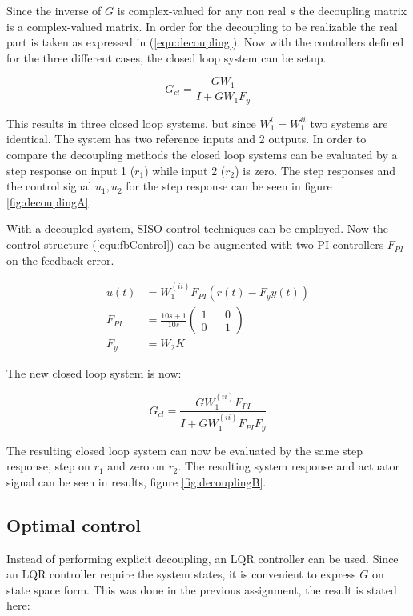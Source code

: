 \documentclass[a4paper, titlepage]{article}
\begin{document}
Since the inverse of $G$ is complex-valued for any non real $s$ the decoupling matrix is a complex-valued matrix.
In order for the decoupling to be realizable the real part is taken as expressed in (\ref{equ:decoupling}).
Now with the controllers defined for the three different cases, the closed loop system can be setup.

\begin{equation}
G_{cl} = \frac{GW_1}{I+GW_1F_y}
\label{equ:closedLoopDecoup}
\end{equation}

This results in three closed loop systems, but since $W^{i}_1 = W^{ii}_1$ two systems are identical.
The system has two reference inputs and 2 outputs.
In order to compare the decoupling methods the closed loop systems can be evaluated by a step response on input 1 ($r_1$) while input 2 ($r_2$) is zero.
The step responses and the control signal $u_1, u_2$ for the step response can be seen in figure \ref{fig:decouplingA}.

With a decoupled system, SISO control techniques can be employed.
Now the control structure (\ref{equ:fbControl}) can be augmented with two PI controllers $F_{PI}$ on the feedback error.

\begin{equation}
\begin{split}
u(t) &= W^{(ii)}_1F_{PI}(r(t) - F_yy(t)) \\
F_{PI} &= \frac{10s+1}{10s}
\begin{pmatrix}
1 && 0 \\ 0 && 1
\end{pmatrix} \\
F_y &= W_2K
\end{split}
\end{equation}

The new closed loop system is now:

\begin{equation}
G_{cl} = \frac{GW^{(ii)}_1F_{PI}}{I+GW^{(ii)}_1F_{PI}F_y}
\end{equation}

The resulting closed loop system can now be evaluated by the same step response, step on $r_1$ and zero on $r_2$.
The resulting system response and actuator signal can be seen in results, figure \ref{fig:decouplingB}.

\subsection{Optimal control}
Instead of performing explicit decoupling, an LQR controller can be used.
Since an LQR controller require the system states, it is convenient to express $G$ on state space form.
This was done in the previous assignment, the result is stated here:
\end{document}
